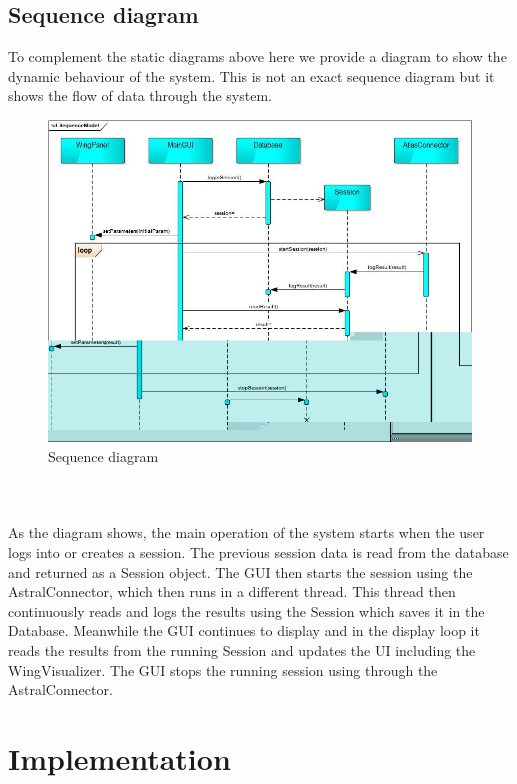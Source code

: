 \documentclass[10pt,a4paper]{report}
\begin{document}
\section{Sequence diagram}
To complement the static diagrams above here we provide a diagram to show the dynamic behaviour of the system. This is not an exact sequence diagram but it shows the flow of data through the system.\\
\begin{figure}[h!]
\includegraphics[width=\textwidth]{SequenceModel.jpg}
\caption{Sequence diagram}
\end{figure}\\
\paragraph*{}
As the diagram shows, the main operation of the system starts when the user logs into or creates a session. The previous session data is read from the database and returned as a Session object. The GUI then starts the session using the AstralConnector, which then runs in a different thread. This thread then continuously reads and logs the results using the Session which saves it in the Database. Meanwhile the GUI continues to display and in the display loop it reads the results from the running Session and updates the UI including the WingVisualizer. The GUI stops the running session using through the AstralConnector.

\chapter{Implementation}
\label{ch:impl}
\end{document}
